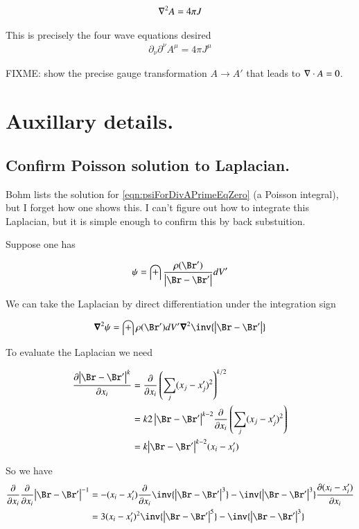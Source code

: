 \documentclass{article}
\begin{document}
\begin{align*}
\nabla^2 A = 4 \pi J
\end{align*}

This is precisely the four wave equations desired
\begin{align*}
\partial_\nu\partial^\nu A^\mu = 4 \pi J^\mu
\end{align*}

FIXME: show the precise gauge transformation $A \rightarrow A'$ that leads to $\nabla \cdot A = 0$.

\section{ Auxillary details. }

\subsection{ Confirm Poisson solution to Laplacian. }

Bohm lists the solution for \ref{eqn:psiForDivAPrimeEqZero} (a Poisson integral), but I forget how one shows this.  I can't figure out how to integrate this Laplacian, but it is simple enough to confirm this by back substuition.

Suppose one has

\begin{align*}
\psi = \int \frac{\rho(\Br')}{\Abs{\Br - \Br'}} dV'
\end{align*}

We can take the Laplacian by direct differentiation under the integration sign

\begin{align*}
\spacegrad^2 \psi = \int {\rho(\Br')} dV' \spacegrad^2 \inv{\Abs{\Br - \Br'}}
\end{align*}

To evaluate the Laplacian we need

\begin{align*}
\PD{x_i}{\Abs{\Br - \Br'}^k} 
&= \PD{x_i}{} \left(\sum_j (x_j - x_j')^2 \right)^{k/2} \\
&= k { 2\Abs{\Br - \Br'}^{k-2}} \PD{x_i}{} \left(\sum_j (x_j - x_j')^2 \right) \\
&= k { \Abs{\Br - \Br'}^{k-2}} (x_i - x_i')
\end{align*}

So we have
\begin{align*}
\PD{x_i}{} \PD{x_i}{} {\Abs{\Br - \Br'}^{-1}} 
&= 
- (x_i - x_i') \PD{x_i}{}{ \inv{ \Abs{\Br - \Br'}^3} } 
- \inv{ \Abs{\Br - \Br'}^3} \PD{x_i}{ (x_i - x_i') } \\
&= 
3 (x_i - x_i')^2 { \inv{ \Abs{\Br - \Br'}^5} } 
- \inv{ \Abs{\Br - \Br'}^3} \\
\end{align*}
\end{document}
